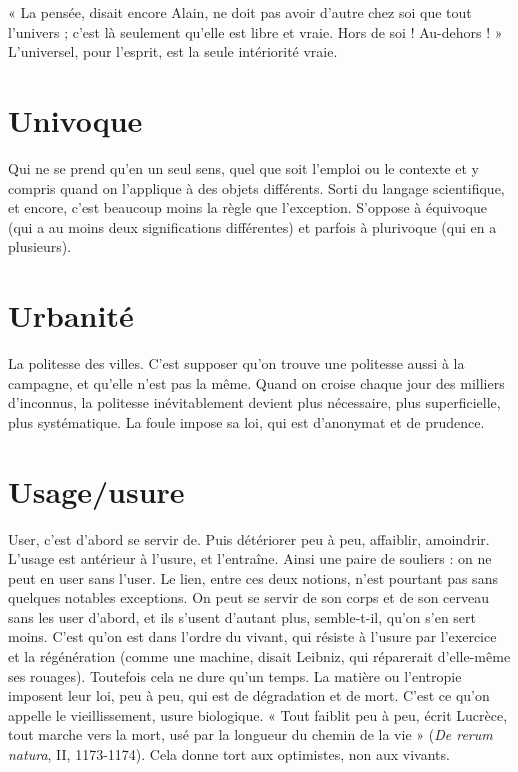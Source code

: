 « La pensée, disait encore Alain, ne doit pas avoir d’autre chez soi que tout
l'univers ; c’est là seulement qu’elle est libre et vraie. Hors de soi ! Au-dehors ! »
L’universel, pour l’esprit, est la seule intériorité vraie.

\section{Univoque}
Qui ne se prend qu’en un seul sens, quel que soit l'emploi ou
le contexte et y compris quand on l’applique à des objets différents.
Sorti du langage scientifique, et encore, c’est beaucoup moins la règle
que l’exception. S’oppose à équivoque (qui a au moins deux significations différentes)
et parfois à plurivoque (qui en a plusieurs).

\section{Urbanité}
La politesse des villes. C’est supposer qu’on trouve une politesse
aussi à la campagne, et qu’elle n’est pas la même. Quand
on croise chaque jour des milliers d’inconnus, la politesse inévitablement
devient plus nécessaire, plus superficielle, plus systématique. La foule impose sa
loi, qui est d’anonymat et de prudence.

\section{Usage/usure}
User, c’est d’abord se servir de. Puis détériorer peu à peu,
affaiblir, amoindrir. L'usage est antérieur à l’usure, et l’entraîne.
Ainsi une paire de souliers : on ne peut en user sans l’user. Le lien, entre
ces deux notions, n’est pourtant pas sans quelques notables exceptions. On
peut se servir de son corps et de son cerveau sans les user d’abord, et ils s’usent
d'autant plus, semble-t-il, qu’on s’en sert moins. C’est qu’on est dans l’ordre du
vivant, qui résiste à l’usure par l’exercice et la régénération (comme une
machine, disait Leibniz, qui réparerait d’elle-même ses rouages). Toutefois cela
ne dure qu’un temps. La matière ou l’entropie imposent leur loi, peu à peu, qui
est de dégradation et de mort. C’est ce qu’on appelle le vieillissement, usure
biologique. « Tout faiblit peu à peu, écrit Lucrèce, tout marche vers la mort,
usé par la longueur du chemin de la vie » ({\it De rerum natura}, II, 1173-1174).
Cela donne tort aux optimistes, non aux vivants.

